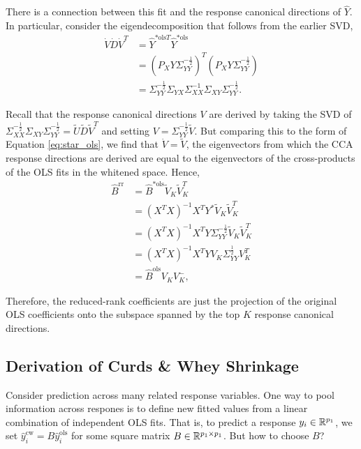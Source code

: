 \documentclass[14pt]{extarticle}
\begin{document}
There is a connection between this fit and the response canonical directions of
$\hat{Y}$. In particular, consider the eigendecomposition that follows from the
earlier SVD,
\begin{align}
\dot{V}\dot{D}\dot{V}^{T} &=   \hat{Y}^{\ast \text{ols} T}  \hat{Y}^{\ast \text{ols}} \nonumber \\
&= \left(P_{X}Y\Sigma_{YY}^{-\frac{1}{2}}\right)^{T}\left(P_{X}Y\Sigma_{YY}^{-\frac{1}{2}}\right)\nonumber \\
  &= \Sigma_{YY}^{-\frac{1}{2}}\Sigma_{YX} \Sigma_{XX}^{-1}\Sigma_{XY}\Sigma_{YY}^{-\frac{1}{2}}. \label{eq:star_ols}
\end{align}

Recall that the response canonical directions $V$ are derived by taking the SVD
of $\Sigma_{XX}^{-\frac{1}{2}}\Sigma_{XY}\Sigma_{YY}^{-\frac{1}{2}} =
\tilde{U}\tilde{D}\tilde{V}^{T}$ and setting $V =
\Sigma_{YY}^{-\frac{1}{2}}\tilde{V}$. But comparing this to the form of Equation
\ref{eq:star_ols}, we find that $\dot{V} = \tilde{V}$, the eigenvectors from
which the CCA response directions are derived are equal to the eigenvectors of
the cross-products of the OLS fits in the whitened space. Hence,
\begin{align*}
\hat{B}^{\text{rr}} &= \hat{B}^{\ast \text{ols}}\tilde{V}_{K}\tilde{V}_{K}^{T} \\
&= \left(X^{T}X\right)^{-1}X^{T}Y^{\ast}\tilde{V}_{K}\tilde{V}_{K}^{T} \\
&= \left(X^{T}X\right)^{-1}X^{T}Y\Sigma_{YY}^{-\frac{1}{2}}\tilde{V}_{K}\tilde{V}_{K}^{T} \\
&= \left(X^{T}X\right)^{-1}X^{T}Y V_{K} \Sigma_{YY}^{\frac{1}{2}}V_{K}^{T} \\
&= \hat{B}^{\text{ols}}V_{K}V_{K}^{-},
\end{align*}

Therefore, the reduced-rank coefficients are just the projection of the original
OLS coefficients onto the subspace spanned by the top $K$ response canonical
directions.

\subsection{Derivation of Curds \& Whey Shrinkage}
\label{subsec:derivation_curds_and_whey}

Consider prediction across many related response variables. One way to pool
information across respones is to define new fitted values from a linear
combination of independent OLS fits. That is, to predict a response $y_{i} \in
\mathbb{R}^{p_{1}}$, we set $\hat{y}^{\text{cw}}_{i} = B\hat{y}^{\text{ols}}_{i}$
for some square matrix $B \in \mathbb{R}^{p_{1} \times p_{1}}$. But how to choose
$B$?
\end{document}

